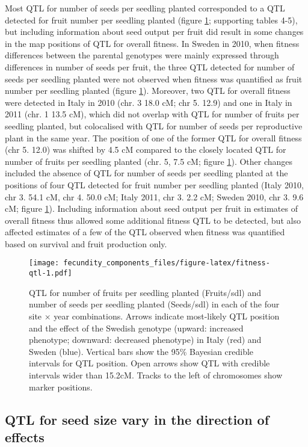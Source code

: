 \documentclass[]{article}
\begin{document}
Most QTL for number of seeds per seedling planted corresponded to a QTL detected for fruit number per seedling planted (figure \ref{fig:fitness-qtl}; supporting tables 4-5), but including information about seed output per fruit did result in some changes in the map positions of QTL for overall fitness.
In Sweden in 2010, when fitness differences between the parental genotypes were mainly expressed through differences in number of seeds per fruit, the three QTL detected for number of seeds per seedling planted were not observed when fitness was quantified as fruit number per seedling planted (figure \ref{fig:fitness-qtl}).
Moreover, two QTL for overall fitness were detected in Italy in 2010 (chr. 3 18.0 cM; chr 5. 12.9) and one in Italy in 2011 (chr. 1 13.5 cM), which did not overlap with QTL for number of fruits per seedling planted, but colocalised with QTL for number of seeds per reproductive plant in the same year.
The position of one of the former QTL for overall fitness (chr 5. 12.0) was shifted by 4.5 cM compared to the closely located QTL for number of fruits per seedling planted (chr. 5, 7.5 cM; figure \ref{fig:fitness-qtl}).
Other changes included the absence of QTL for number of seeds per seedling planted at the positions of four QTL detected for fruit number per seedling planted (Italy 2010, chr 3. 54.1 cM, chr 4. 50.0 cM; Italy 2011, chr 3. 2.2 cM; Sweden 2010, chr 3. 9.6 cM; figure \ref{fig:fitness-qtl}). Including information about seed output per fruit in estimates of overall fitness thus allowed some additional fitness QTL to be detected, but also affected estimates of a few of the QTL observed when fitness was quantified based on survival and fruit production only.

\begin{figure}
\centering
\texttt{[image: fecundity\_components\_files/figure-latex/fitness-qtl-1.pdf]}
\caption{\label{fig:fitness-qtl}QTL for number of fruits per seedling planted (Fruits/sdl) and number of seeds per seedling planted (Seeds/sdl) in each of the four site × year combinations. Arrows indicate most-likely QTL position and the effect of the Swedish genotype (upward: increased phenotype; downward: decreased phenotype) in Italy (red) and Sweden (blue). Vertical bars show the 95\% Bayesian credible intervals for QTL position. Open arrows show QTL with credible intervals wider than 15.2cM. Tracks to the left of chromosomes show marker positions.}
\end{figure}

\hypertarget{qtl-for-seed-size-vary-in-the-direction-of-effects}{%
\subsection{QTL for seed size vary in the direction of effects}\label{qtl-for-seed-size-vary-in-the-direction-of-effects}}
\end{document}
